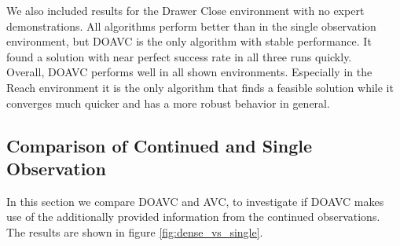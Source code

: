 We also included results for the Drawer Close environment with no expert demonstrations. All algorithms perform better than in the single observation environment, 
but DOAVC is the only algorithm with stable performance. It found a solution with near perfect success rate in all three runs quickly. \\

Overall, DOAVC performs well in all shown environments. Especially in the Reach environment it is the only algorithm that finds a feasible solution while it 
converges much quicker and has a more robust behavior in general. 






\subsection{Comparison of Continued and Single Observation}
\label{sec:com_coavc_avc}
In this section we compare DOAVC and AVC, to investigate if DOAVC makes use of the additionally provided information from the continued observations. 
The results are shown in figure \ref{fig:dense_vs_single}.\\

